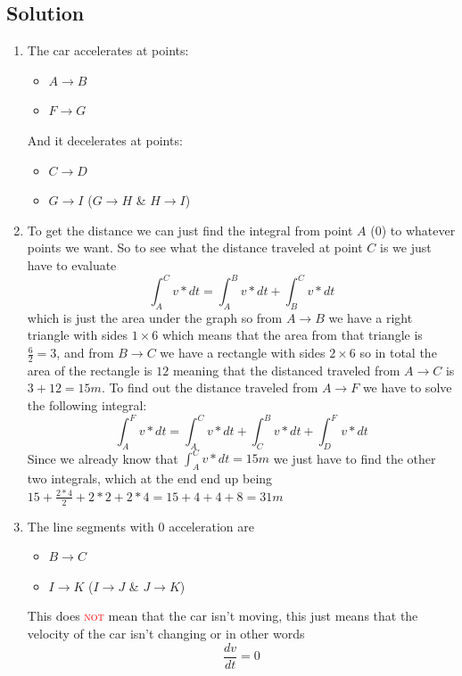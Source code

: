 \documentclass[a4paper, 10pt]{article}
\begin{document}
		\subsection{Solution}
			\begin{enumerate}
				\item 
					\noindent The car accelerates at points:
					\begin{itemize}
						\item $A \rightarrow B$
						\item $F \rightarrow G$
					\end{itemize}
				
					\noindent And it decelerates at points:
					\begin{itemize}
						\item $C \rightarrow D$
						\item $G \rightarrow I$ ($G \rightarrow H$ \& $H \rightarrow I$)
					\end{itemize}
				\item 
					To get the distance we can just find the integral from point $A$ (0) to whatever points we want. So to see what the distance traveled at point $C$ is we just have to evaluate \[\int_{A}^{C}v*dt = \int_{A}^{B}v*dt + \int_{B}^{C}v*dt\]which is just the area under the graph so from $A \rightarrow B$ we have a right triangle with sides $1 \times 6$ which means that the area from that triangle is $\frac{6}{2} = 3$, and from $B \rightarrow C$ we have a rectangle with sides $2 \times 6$ so in total the area of the rectangle is $12$ meaning that the distanced traveled from $A \rightarrow C$ is $3 + 12 = 15m$. To find out the distance traveled from $A \rightarrow F$ we have to solve the following integral: \[\int_{A}^{F}v*dt = \int_{A}^{C}v*dt + \int_{C}^{B}v*dt + \int_{D}^{F}v*dt\]
					Since we already know that $\int_{A}^{C}v*dt = 15m$ we just have to find the other two integrals, which at the end end up being $15 + \frac{2*4}{2} + 2*2 + 2*4 = 15 + 4 + 4 + 8 = 31m$
				\item 
					The line segments with $0$ acceleration are
					\begin{itemize}
						\item $B \rightarrow C$
						\item $I \rightarrow K$ ($I \rightarrow J$ \& $J \rightarrow K$)
					\end{itemize}
					This does \textcolor{red}{\textsc{not}} mean that the car isn't moving, this just means that the velocity of the car isn't changing or in other words \[\frac{dv}{dt} = 0\]

\end{enumerate}
\end{document}
